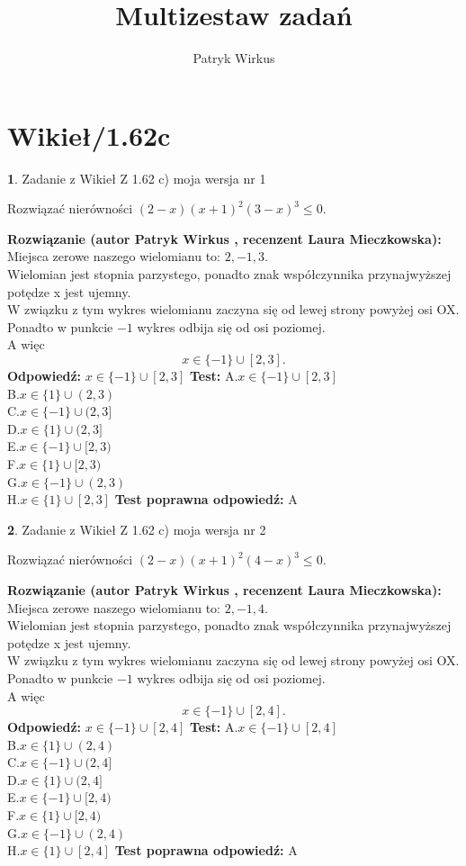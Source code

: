 \documentclass[12pt, a4paper]{article}
\title{Multizestaw zadań}
\author{Patryk Wirkus}
\date{}
\theoremstyle{definition} %
\newtheorem{zad}{}
\newcommand{\kategoria}[1]{\section{#1}}
\newcommand{\zadStart}[1]{\begin{zad}#1\newline}
\newcommand{\zadStop}{\end{zad}}
\newcommand{\rozwStart}[2]{\noindent \textbf{Rozwiązanie (autor #1 , recenzent #2): }\newline}
\newcommand{\rozwStop}{\newline}
\newcommand{\odpStart}{\noindent \textbf{Odpowiedź:}\newline}
\newcommand{\odpStop}{\newline}
\newcommand{\testStart}{\noindent \textbf{Test:}\newline}
\newcommand{\testStop}{\newline}
\newcommand{\kluczStart}{\noindent \textbf{Test poprawna odpowiedź:}\newline}
\newcommand{\kluczStop}{\newline}
\begin{document}
\maketitle

\kategoria{Wikieł/1.62c}


\zadStart{Zadanie z Wikieł Z 1.62 c) moja wersja nr 1}

Rozwiązać nierówności $(2-x)(x+1)^{2}(3-x)^{3}\le0$.
\zadStop
\rozwStart{Patryk Wirkus}{Laura Mieczkowska}
Miejsca zerowe naszego wielomianu to: $2, -1, 3$.\\
Wielomian jest stopnia parzystego, ponadto znak współczynnika przy\linebreak najwyższej potędze x jest ujemny.\\ W związku z tym wykres wielomianu zaczyna się od lewej strony powyżej osi OX.\\
Ponadto w punkcie $-1$ wykres odbija się od osi poziomej.\\
A więc $$x \in \{-1\} \cup [2,3].$$
\rozwStop
\odpStart
$x \in \{-1\} \cup [2,3]$
\odpStop
\testStart
A.$x \in \{-1\} \cup [2,3]$\\
B.$x \in \{1\} \cup (2,3)$\\
C.$x \in \{-1\} \cup (2,3]$\\
D.$x \in \{1\} \cup (2,3]$\\
E.$x \in \{-1\} \cup [2,3)$\\
F.$x \in \{1\} \cup [2,3)$\\
G.$x \in \{-1\} \cup (2,3)$\\
H.$x \in \{1\} \cup [2,3]$
\testStop
\kluczStart
A
\kluczStop



\zadStart{Zadanie z Wikieł Z 1.62 c) moja wersja nr 2}

Rozwiązać nierówności $(2-x)(x+1)^{2}(4-x)^{3}\le0$.
\zadStop
\rozwStart{Patryk Wirkus}{Laura Mieczkowska}
Miejsca zerowe naszego wielomianu to: $2, -1, 4$.\\
Wielomian jest stopnia parzystego, ponadto znak współczynnika przy\linebreak najwyższej potędze x jest ujemny.\\ W związku z tym wykres wielomianu zaczyna się od lewej strony powyżej osi OX.\\
Ponadto w punkcie $-1$ wykres odbija się od osi poziomej.\\
A więc $$x \in \{-1\} \cup [2,4].$$
\rozwStop
\odpStart
$x \in \{-1\} \cup [2,4]$
\odpStop
\testStart
A.$x \in \{-1\} \cup [2,4]$\\
B.$x \in \{1\} \cup (2,4)$\\
C.$x \in \{-1\} \cup (2,4]$\\
D.$x \in \{1\} \cup (2,4]$\\
E.$x \in \{-1\} \cup [2,4)$\\
F.$x \in \{1\} \cup [2,4)$\\
G.$x \in \{-1\} \cup (2,4)$\\
H.$x \in \{1\} \cup [2,4]$
\testStop
\kluczStart
A
\kluczStop
\end{document}
